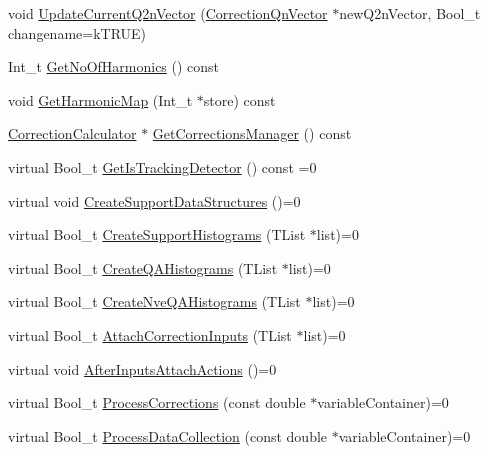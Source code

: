 \begin{DoxyCompactItemize}
\item 
void \mbox{\hyperlink{classQn_1_1DetectorConfiguration_abeabec819fe0cab801d7afbe185abe40}{Update\+Current\+Q2n\+Vector}} (\mbox{\hyperlink{classQn_1_1CorrectionQnVector}{Correction\+Qn\+Vector}} $\ast$new\+Q2n\+Vector, Bool\+\_\+t changename=k\+T\+R\+UE)
\item 
Int\+\_\+t \mbox{\hyperlink{classQn_1_1DetectorConfiguration_a88f8b14da5e8faa8fd2548c6ab06f68a}{Get\+No\+Of\+Harmonics}} () const
\item 
void \mbox{\hyperlink{classQn_1_1DetectorConfiguration_a3e8079b295c46564e525072dab4ae055}{Get\+Harmonic\+Map}} (Int\+\_\+t $\ast$store) const
\item 
\mbox{\hyperlink{classQn_1_1CorrectionCalculator}{Correction\+Calculator}} $\ast$ \mbox{\hyperlink{classQn_1_1DetectorConfiguration_a20a27b09e0d2f3209b8de97906c52711}{Get\+Corrections\+Manager}} () const
\item 
virtual Bool\+\_\+t \mbox{\hyperlink{classQn_1_1DetectorConfiguration_acdb57db96ed24524b5a3a28821727a3d}{Get\+Is\+Tracking\+Detector}} () const =0
\item 
virtual void \mbox{\hyperlink{classQn_1_1DetectorConfiguration_a664f65925f22f8f02c1a216f77b533ce}{Create\+Support\+Data\+Structures}} ()=0
\item 
virtual Bool\+\_\+t \mbox{\hyperlink{classQn_1_1DetectorConfiguration_a8e5e2eef94bca58a3dcf34fe5fbd1429}{Create\+Support\+Histograms}} (T\+List $\ast$list)=0
\item 
virtual Bool\+\_\+t \mbox{\hyperlink{classQn_1_1DetectorConfiguration_a9f527d4c584e6bd79b6b8eb0b7f5413a}{Create\+Q\+A\+Histograms}} (T\+List $\ast$list)=0
\item 
virtual Bool\+\_\+t \mbox{\hyperlink{classQn_1_1DetectorConfiguration_ade61875d8e7a05dd413c94d6887ae4ac}{Create\+Nve\+Q\+A\+Histograms}} (T\+List $\ast$list)=0
\item 
virtual Bool\+\_\+t \mbox{\hyperlink{classQn_1_1DetectorConfiguration_a4ae0eb587070e68a11fbb438d96fca15}{Attach\+Correction\+Inputs}} (T\+List $\ast$list)=0
\item 
virtual void \mbox{\hyperlink{classQn_1_1DetectorConfiguration_ab6766905dffe5811aefa59dd1e1117d8}{After\+Inputs\+Attach\+Actions}} ()=0
\item 
virtual Bool\+\_\+t \mbox{\hyperlink{classQn_1_1DetectorConfiguration_aad0610bd5d168c29a32025ddf641e3fc}{Process\+Corrections}} (const double $\ast$variable\+Container)=0
\item 
virtual Bool\+\_\+t \mbox{\hyperlink{classQn_1_1DetectorConfiguration_ac78ed44b460217fda7d094cc102504c4}{Process\+Data\+Collection}} (const double $\ast$variable\+Container)=0

\end{DoxyCompactItemize}
